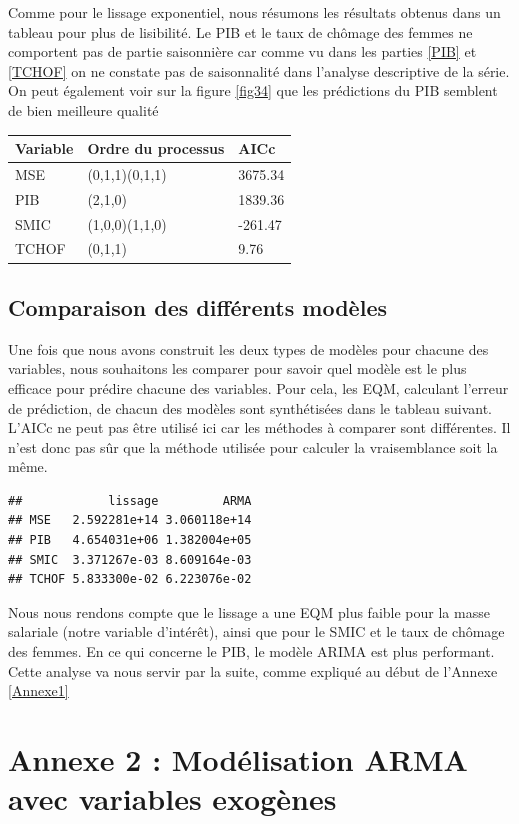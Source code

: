 \documentclass[11pt,]{article}
\begin{document}
Comme pour le lissage exponentiel, nous résumons les résultats obtenus
dans un tableau pour plus de lisibilité. Le PIB et le taux de chômage
des femmes ne comportent pas de partie saisonnière car comme vu dans les
parties \ref{PIB} et \ref{TCHOF} on ne constate pas de saisonnalité dans
l'analyse descriptive de la série. On peut également voir sur la figure
\ref{fig34} que les prédictions du PIB semblent de bien meilleure
qualité

\begin{longtable}[]{@{}lll@{}}
\toprule
Variable & Ordre du processus & AICc\tabularnewline
\midrule
\endhead
MSE & (0,1,1)(0,1,1) & 3675.34\tabularnewline
PIB & (2,1,0) & 1839.36\tabularnewline
SMIC & (1,0,0)(1,1,0) & -261.47\tabularnewline
TCHOF & (0,1,1) & 9.76\tabularnewline
\bottomrule
\end{longtable}

\subsection{Comparaison des différents
modèles}\label{comparaison-des-differents-modeles-1}

Une fois que nous avons construit les deux types de modèles pour chacune
des variables, nous souhaitons les comparer pour savoir quel modèle est
le plus efficace pour prédire chacune des variables. Pour cela, les EQM,
calculant l'erreur de prédiction, de chacun des modèles sont
synthétisées dans le tableau suivant. L'AICc ne peut pas être utilisé
ici car les méthodes à comparer sont différentes. Il n'est donc pas sûr
que la méthode utilisée pour calculer la vraisemblance soit la même.

\begin{verbatim}
##            lissage         ARMA
## MSE   2.592281e+14 3.060118e+14
## PIB   4.654031e+06 1.382004e+05
## SMIC  3.371267e-03 8.609164e-03
## TCHOF 5.833300e-02 6.223076e-02
\end{verbatim}

Nous nous rendons compte que le lissage a une EQM plus faible pour la
masse salariale (notre variable d'intérêt), ainsi que pour le SMIC et le
taux de chômage des femmes. En ce qui concerne le PIB, le modèle ARIMA
est plus performant. Cette analyse va nous servir par la suite, comme
expliqué au début de l'Annexe \ref{Annexe1}

\section{\texorpdfstring{Annexe 2 : Modélisation ARMA avec variables
exogènes
\label{Annexe2}}{Annexe 2 : Modélisation ARMA avec variables exogènes }}\label{annexe-2-modelisation-arma-avec-variables-exogenes}
\end{document}
